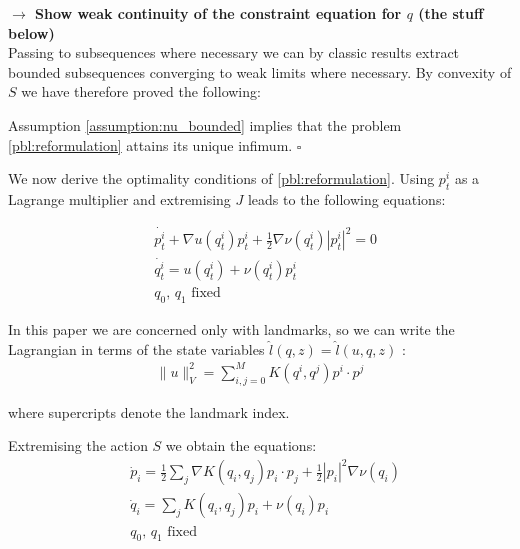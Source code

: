 \documentclass[runningheads]{llncs}
\newcommand{\half}{\frac 12}
\newcommand{\norm}[2]{\| #1 \|_{ #2 }}
\newcommand{\vnorm}[1]{\norm{ #1 }{V}}
\newcommand{\RdM}{\mathbb{R}^{d\times M}}
\begin{document}
\textbf{$\longrightarrow$ Show weak continuity of the constraint equation for
$q$ (the stuff below)}\\

Passing to subsequences where necessary we can by classic results
\cite{younes2010shapes} extract bounded subsequences converging to weak limits
where necessary. By convexity of $S$ we have therefore proved the following:

\begin{theorem}
Assumption \ref{assumption:nu_bounded} implies that the problem
\eqref{pbl:reformulation} attains its unique infimum.
{\hfill $\square$}
\end{theorem}

We now derive the optimality conditions of \eqref{pbl:reformulation}.
Using $p_t^i$ as a Lagrange multiplier and extremising $J$ leads to the
following equations:

\begin{align}
& \dot{p_t^i} + \nabla u(q_t^i) p_t^i + \half \nabla \nu(q_t^i) |p_t^i|^2 = 0\\
& \dot{q_t^i} = u(q_t^i) + \nu(q_t^i) p^i_t\\
& q_0,\,q_1\text{ fixed}
\end{align}
  \label{pbm:nonlinear_inner:optimality}

In this paper we are concerned only with
landmarks, so we can write the Lagrangian in terms of the state variables $\hat
l(q, z) = \hat l(u, q, z)$ \cite{younes2010shapes}:
\begin{align*}
\vnorm{u}^2 = \sum_{i,j=0}^M K(q^i,q^j) p^i \cdot p^j
\end{align*}

where supercripts denote the landmark index. 

Extremising the action $S$ we obtain the equations: 
\begin{align}\label{pq:optimality}
& \dot p_i =\frac12 \sum_j \nabla K(q_i,q_j)p_i\cdot p_j  + \frac12 |p_i|^2 \nabla \nu(q_i)\\
& \dot q_i = \sum_j K(q_i,q_j)p_i + \nu(q_i)p_i\\
& q_0,\,q_1\text{ fixed}
\end{align}
\end{document}
